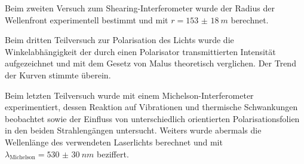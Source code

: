\documentclass[ngerman]{scrartcl}
\begin{document}
Beim zweiten Versuch zum Shearing-Interferometer wurde der Radius der Wellenfront experimentell bestimmt und mit \(r=\SI{153(18)}{m}\) berechnet.

Beim dritten Teilversuch zur Polarisation des Lichts wurde die Winkelabhängigkeit der durch einen Polarisator transmittierten Intensität aufgezeichnet und mit dem Gesetz von Malus theoretisch verglichen. Der Trend der Kurven stimmte überein.

Beim letzten Teilversuch wurde mit einem Michelson-Interferometer experimentiert, dessen Reaktion auf Vibrationen und thermische Schwankungen beobachtet sowie der Einfluss von unterschiedlich orientierten Polarisationsfolien in den beiden Strahlengängen untersucht. Weiters wurde abermals die Wellenlänge des verwendeten Laserlichts berechnet und mit \(\lambda_{\text{Michelson}} = \SI{530(30)}{nm}\) beziffert.



\clearpage
\printbibliography

\listoffigures

\listoftables
\end{document}
